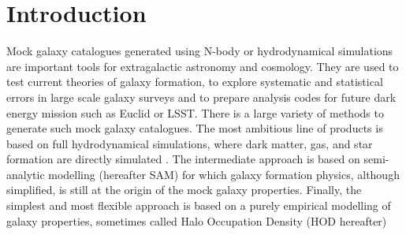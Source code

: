 \documentclass[a4paper,twocolumn,fleqn,usenatbib]{mnras}
\providecommand{\DIFaddbegin}{} %
\providecommand{\DIFaddend}{} %
\providecommand{\DIFdelbegin}{} %
\providecommand{\DIFdelend}{} %
\newcommand{\DIFscaledelfig}{0.5}
\newlength{\DIFdelgraphicswidth} %
\newlength{\DIFdelgraphicsheight} %
\newcommand{\DIFaddincludegraphics}[2][]{{\color{blue}\fbox{\DIFOincludegraphics[#1]{#2}}}} %
\newcommand{\DIFdelincludegraphics}[2][]{%
\sbox{\DIFdelgraphicsbox}{\DIFOincludegraphics[#1]{#2}}%
\settoboxwidth{\DIFdelgraphicswidth}{\DIFdelgraphicsbox} %
\settoboxtotalheight{\DIFdelgraphicsheight}{\DIFdelgraphicsbox} %
\scalebox{\DIFscaledelfig}{%
\parbox[b]{\DIFdelgraphicswidth}{\usebox{\DIFdelgraphicsbox}\\[-\baselineskip] \rule{\DIFdelgraphicswidth}{0em}}\llap{\resizebox{\DIFdelgraphicswidth}{\DIFdelgraphicsheight}{%
\setlength{\unitlength}{\DIFdelgraphicswidth}%
\begin{picture}(1,1)%
\thicklines\linethickness{2pt} %
{\color[rgb]{1,0,0}\put(0,0){\framebox(1,1){}}}%
{\color[rgb]{1,0,0}\put(0,0){\line( 1,1){1}}}%
{\color[rgb]{1,0,0}\put(0,1){\line(1,-1){1}}}%
\end{picture}%
}\hspace*{3pt}}} %
} %
\DeclareRobustCommand{\DIFaddbegin}{\DIFOaddbegin \let\includegraphics\DIFaddincludegraphics} %
\DeclareRobustCommand{\DIFaddend}{\DIFOaddend \let\includegraphics\DIFOincludegraphics} %
\DeclareRobustCommand{\DIFdelbegin}{\DIFOdelbegin \let\includegraphics\DIFdelincludegraphics} %
\DeclareRobustCommand{\DIFdelend}{\DIFOaddend \let\includegraphics\DIFOincludegraphics} %
\begin{document}
\section{Introduction}

Mock galaxy catalogues generated using N-body or hydrodynamical
simulations are important tools for extragalactic astronomy and
cosmology.  They are used to test current theories of galaxy
formation, to explore systematic and statistical errors in large scale
galaxy surveys and to prepare analysis codes for future dark energy
mission such as Euclid or LSST.  There is a large variety of methods
to generate such mock galaxy catalogues.  The most ambitious line of
products is based on full hydrodynamical simulations, where dark
matter, gas, and star formation are directly simulated
\DIFdelbegin %
\DIFdelend \DIFaddbegin \citep[e.g.][]{duboisDancingDarkGalactic2014,
  khandaiMassiveBlackIISimulationEvolution2015,
  vogelsbergerPropertiesGalaxiesReproduced2014,
  schayeEAGLEProjectSimulating2015}\DIFaddend .
The intermediate approach is based on semi-analytic modelling 
(hereafter SAM) \DIFdelbegin %
\DIFdelend \DIFaddbegin \citep[e.g.][]{SA-white,
  SA-durham, SA-Somerville, SA-Kaufmann,
  kangSemianalyticalModelGalaxy2005,crotonManyLivesActive2006} \DIFaddend for
which galaxy formation physics, although simplified, is still at the
origin of the mock galaxy properties. Finally, the simplest and most
flexible approach is based on a purely empirical modelling of galaxy
properties, sometimes called Halo Occupation Density (HOD hereafter)
\DIFdelbegin %
\end{document}

